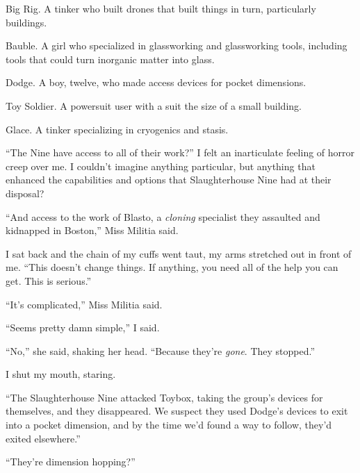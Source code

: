 Big Rig.  A tinker who built drones that built things in turn, particularly buildings.



Bauble.  A girl who specialized in glassworking and glassworking tools, including tools that could turn inorganic matter into glass.



Dodge.  A boy, twelve, who made access devices for pocket dimensions.



Toy Soldier.  A powersuit user with a suit the size of a small building.



Glace.  A tinker specializing in cryogenics and stasis.



``The Nine have access to all of their work?''  I felt an inarticulate feeling of horror creep over me.  I couldn't imagine anything particular, but anything that enhanced the capabilities and options that Slaughterhouse Nine had at their disposal?



``And access to the work of Blasto, a \emph{cloning} specialist they assaulted and kidnapped in Boston,'' Miss Militia said.



I sat back and the chain of my cuffs went taut, my arms stretched out in front of me.  ``This doesn't change things.  If anything, you need all of the help you can get.  This is serious.''



``It's complicated,'' Miss Militia said.



``Seems pretty damn simple,'' I said.



``No,'' she said, shaking her head.  ``Because they're \emph{gone}.  They stopped.''



I shut my mouth, staring.



``The Slaughterhouse Nine attacked Toybox, taking the group's devices for themselves, and they disappeared.  We suspect they used Dodge's devices to exit into a pocket dimension, and by the time we'd found a way to follow, they'd exited elsewhere.''



``They're dimension hopping?''



